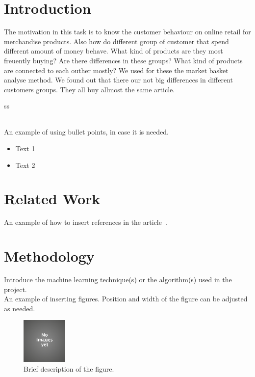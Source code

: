 \documentclass[11pt]{article}
\title{\MakeMeBlue{Market Basket Analyse on Online Retail}}
\author{Uchralt Temuulen}
\date{2018 07 08}
\begin{document}
\maketitle

\section{Introduction}
The motivation in this task is to know the customer behaviour on online retail for merchandise products. 
Also how do different group of customer that spend different 
amount of money behave. What kind of products are they most freuently buying? Are there differences in these groups? What kind of products are connected to each outher mostly? 
We used for these the market basket analyse method. We found out that there our not big differences in different customers groups. They all buy allmost the same article. 

ss


 
\\

An example of using bullet points, in case it is needed.
\begin{itemize}[leftmargin=1cm]
   \item Text 1
   \item Text 2
\end{itemize}

\section{Related Work}
An example of how to insert references in the article~\cite{hu2011}.


\section{Methodology}
Introduce the machine learning technique(s) or the algorithm(s) used in the project. \\

An example of inserting figures. Position and width of the figure can be adjusted as needed.
\begin{figure}[!htp]        
  \centering
    \includegraphics[width=0.2\textwidth]{image.jpg}
    \caption{Brief description of the figure.}
\end{figure}
\end{document}
